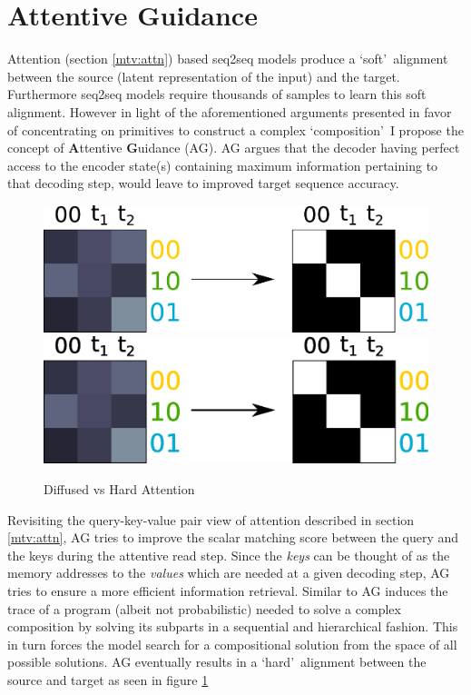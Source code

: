 \section{Attentive Guidance}

Attention (section \ref{mtv:attn}) based seq2seq models produce a \lq soft{}\rq\ alignment between the source (latent representation of the input) and the target. Furthermore seq2seq models require thousands of samples to learn this soft alignment. However in light of the aforementioned arguments presented in favor of concentrating on primitives to construct a complex \lq composition{}\rq\ I propose the concept of \textbf{A}ttentive \textbf{G}uidance (AG). AG argues that the decoder having perfect access to the encoder state(s) containing maximum information pertaining to that decoding step, would leave to improved target sequence accuracy.

\begin{figure}
	\begin{minipage}[t]{\textwidth}
		\ifpdf
		\includegraphics[width=\linewidth,keepaspectratio=true]{./figs/attention-guidance-pdf}
		\else
		\includegraphics[width=\linewidth,keepaspectratio=true]{./figs/attention-guidance-eps}
		\fi
		\caption{\small Diffused vs Hard Attention}
		\label{pm:ag-schematic}
	\end{minipage}
\end{figure}

Revisiting the query-key-value pair view of attention described in section \ref{mtv:attn}, AG tries to improve the scalar matching score between the query and the keys during the attentive read step. Since the \textit{keys} can be thought of as the memory addresses to the \textit{values} which are needed at a given decoding step, AG tries to ensure a more efficient information retrieval. Similar to \cite{Lake2015} AG induces the trace of a program (albeit not probabilistic) needed to solve a complex composition by solving its subparts in a sequential and hierarchical fashion. This in turn forces the model search for a compositional solution from the space of all possible solutions. AG eventually results in a \lq hard{}\rq\ alignment between the source and target as seen in figure \ref{pm:ag-schematic}


